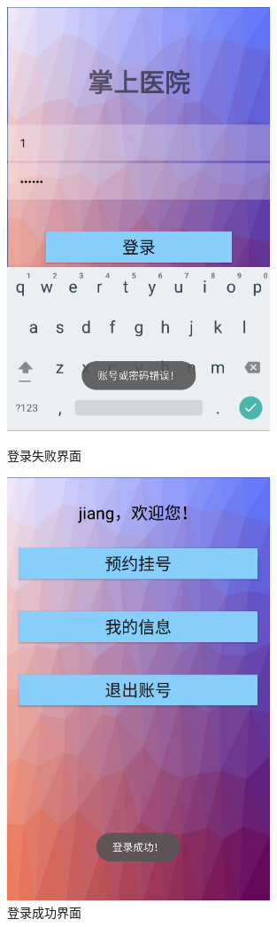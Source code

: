 \documentclass[UTF8,12pt]{article}
\begin{document}
\begin{figure}[htbp]
    \begin{minipage}[t]{0.45\textwidth}
        \centering
        \includegraphics[width=0.7\textwidth]{imgs/29.png}
        \caption{登录失败界面}
    \end{minipage}%
    \begin{minipage}[t]{0.45\textwidth}
        \centering
        \includegraphics[width=0.7\textwidth]{imgs/30.png}
        \caption{登录成功界面}
    \end{minipage}
\end{figure}
\end{document}
